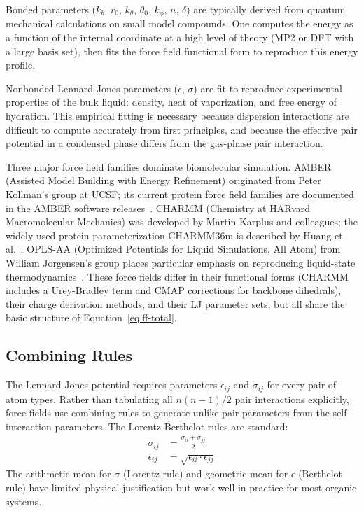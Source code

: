 Bonded parameters ($k_b$, $r_0$, $k_\theta$, $\theta_0$, $k_\phi$, $n$, $\delta$) are typically derived from quantum mechanical calculations on small model compounds. One computes the energy as a function of the internal coordinate at a high level of theory (MP2 or DFT with a large basis set), then fits the force field functional form to reproduce this energy profile.

Nonbonded Lennard-Jones parameters ($\epsilon$, $\sigma$) are fit to reproduce experimental properties of the bulk liquid: density, heat of vaporization, and free energy of hydration. This empirical fitting is necessary because dispersion interactions are difficult to compute accurately from first principles, and because the effective pair potential in a condensed phase differs from the gas-phase pair interaction.

Three major force field families dominate biomolecular simulation. AMBER (Assisted Model Building with Energy Refinement) originated from Peter Kollman's group at UCSF; its current protein force field families are documented in the AMBER software releases~\cite{case2023}. CHARMM (Chemistry at HARvard Macromolecular Mechanics) was developed by Martin Karplus and colleagues; the widely used protein parameterization CHARMM36m is described by Huang et al.~\cite{huang2017charmm}. OPLS-AA (Optimized Potentials for Liquid Simulations, All Atom) from William Jorgensen's group places particular emphasis on reproducing liquid-state thermodynamics~\cite{jorgensen1996oplssaa}. These force fields differ in their functional forms (CHARMM includes a Urey-Bradley term and CMAP corrections for backbone dihedrals), their charge derivation methods, and their LJ parameter sets, but all share the basic structure of Equation~\ref{eq:ff-total}.

\subsection{Combining Rules}
\label{sec:combining-rules}

The Lennard-Jones potential requires parameters $\epsilon_{ij}$ and $\sigma_{ij}$ for every pair of atom types. Rather than tabulating all $n(n-1)/2$ pair interactions explicitly, force fields use combining rules to generate unlike-pair parameters from the self-interaction parameters. The Lorentz-Berthelot rules are standard:
\begin{align}
\label{eq:combining-sigma}
\sigma_{ij} &= \frac{\sigma_{ii} + \sigma_{jj}}{2} \\[4pt]
\label{eq:combining-epsilon}
\epsilon_{ij} &= \sqrt{\epsilon_{ii} \cdot \epsilon_{jj}}
\end{align}
The arithmetic mean for $\sigma$ (Lorentz rule) and geometric mean for $\epsilon$ (Berthelot rule) have limited physical justification but work well in practice for most organic systems.

